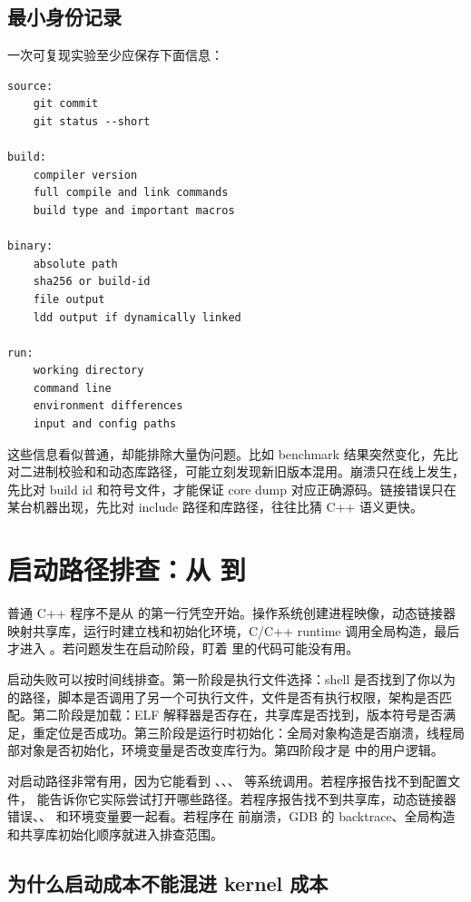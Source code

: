 \subsection{最小身份记录}

一次可复现实验至少应保存下面信息：

\begin{lstlisting}
source:
    git commit
    git status --short

build:
    compiler version
    full compile and link commands
    build type and important macros

binary:
    absolute path
    sha256 or build-id
    file output
    ldd output if dynamically linked

run:
    working directory
    command line
    environment differences
    input and config paths
\end{lstlisting}

这些信息看似普通，却能排除大量伪问题。比如 benchmark 结果突然变化，先比对二进制校验和和动态库路径，可能立刻发现新旧版本混用。崩溃只在线上发生，先比对 build id 和符号文件，才能保证 core dump 对应正确源码。链接错误只在某台机器出现，先比对 include 路径和库路径，往往比猜 C++ 语义更快。

\section{启动路径排查：从  到 }

普通 C++ 程序不是从  的第一行凭空开始。操作系统创建进程映像，动态链接器映射共享库，运行时建立栈和初始化环境，C/C++ runtime 调用全局构造，最后才进入 。若问题发生在启动阶段，盯着  里的代码可能没有用。

启动失败可以按时间线排查。第一阶段是执行文件选择：shell 是否找到了你以为的路径，脚本是否调用了另一个可执行文件，文件是否有执行权限，架构是否匹配。第二阶段是加载：ELF 解释器是否存在，共享库是否找到，版本符号是否满足，重定位是否成功。第三阶段是运行时初始化：全局对象构造是否崩溃，线程局部对象是否初始化，环境变量是否改变库行为。第四阶段才是  中的用户逻辑。

 对启动路径非常有用，因为它能看到 、、、 等系统调用。若程序报告找不到配置文件， 能告诉你它实际尝试打开哪些路径。若程序报告找不到共享库，动态链接器错误、、 和环境变量要一起看。若程序在  前崩溃，GDB 的 backtrace、全局构造和共享库初始化顺序就进入排查范围。

\subsection{为什么启动成本不能混进 kernel 成本}

